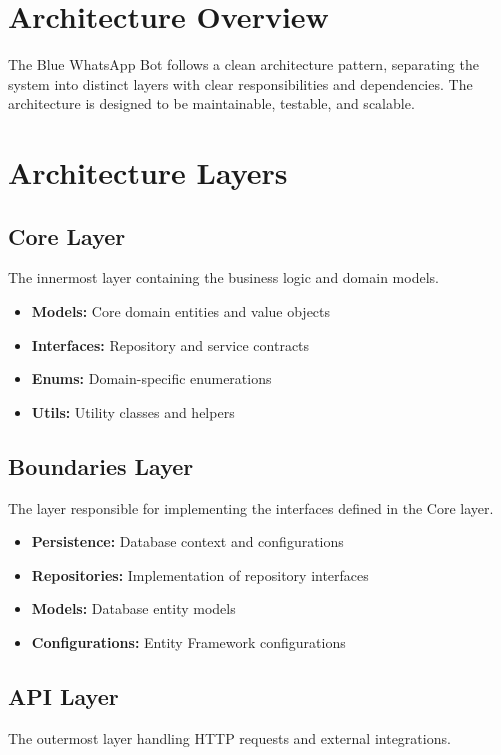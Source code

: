 \section{Architecture Overview}
The Blue WhatsApp Bot follows a clean architecture pattern, separating the system into distinct layers with clear responsibilities and dependencies. The architecture is designed to be maintainable, testable, and scalable.

\section{Architecture Layers}

\subsection{Core Layer}
The innermost layer containing the business logic and domain models.

\begin{itemize}
    \item \textbf{Models:} Core domain entities and value objects
    \item \textbf{Interfaces:} Repository and service contracts
    \item \textbf{Enums:} Domain-specific enumerations
    \item \textbf{Utils:} Utility classes and helpers
\end{itemize}

\subsection{Boundaries Layer}
The layer responsible for implementing the interfaces defined in the Core layer.

\begin{itemize}
    \item \textbf{Persistence:} Database context and configurations
    \item \textbf{Repositories:} Implementation of repository interfaces
    \item \textbf{Models:} Database entity models
    \item \textbf{Configurations:} Entity Framework configurations
\end{itemize}

\subsection{API Layer}
The outermost layer handling HTTP requests and external integrations.

